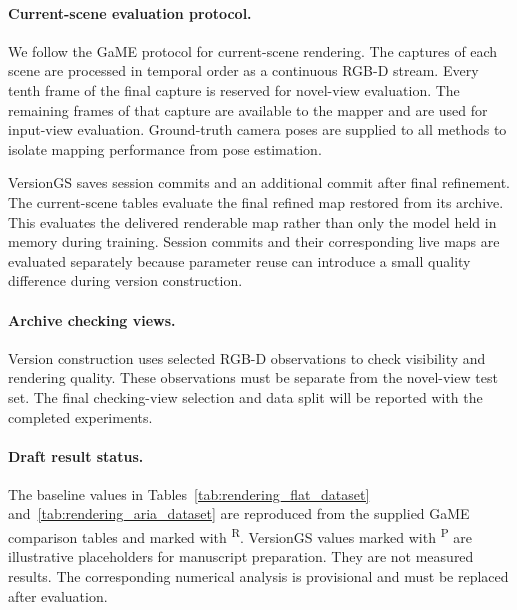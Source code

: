 \paragraph{Current-scene evaluation protocol.}
We follow the GaME protocol for current-scene rendering.
The captures of each scene are processed in temporal order
as a continuous RGB-D stream.
Every tenth frame of the final capture is reserved for
novel-view evaluation.
The remaining frames of that capture are available to the mapper
and are used for input-view evaluation.
Ground-truth camera poses are supplied to all methods
to isolate mapping performance from pose estimation.

VersionGS saves session commits and an additional commit after
final refinement.
The current-scene tables evaluate the final refined map restored
from its archive.
This evaluates the delivered renderable map rather than only
the model held in memory during training.
Session commits and their corresponding live maps are evaluated
separately because parameter reuse can introduce a small quality
difference during version construction.

\paragraph{Archive checking views.}
Version construction uses selected RGB-D observations to check
visibility and rendering quality.
These observations must be separate from the novel-view test set.
The final checking-view selection and data split will be reported
with the completed experiments.

\paragraph{Draft result status.}
The baseline values in
Tables~\ref{tab:rendering_flat_dataset}
and~\ref{tab:rendering_aria_dataset}
are reproduced from the supplied GaME comparison tables
and marked with \textsuperscript{R}.
VersionGS values marked with \textsuperscript{P}
are illustrative placeholders for manuscript preparation.
They are not measured results.
The corresponding numerical analysis is provisional
and must be replaced after evaluation.


